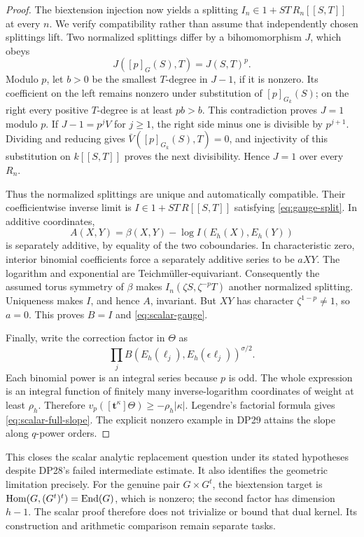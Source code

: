 \documentclass[11pt,a4paper]{article}
\theoremstyle{definition}\newtheorem{remark}[theorem]{Remark}
\begin{document}
\begin{proof}
The biextension injection now yields a splitting $I_n\in1+ST\,R_n[[S,T]]$ at every $n$. We verify compatibility rather than assume that independently chosen splittings lift. Two normalized splittings differ by a bihomomorphism $J$, which obeys
\[
 J([p]_G(S),T)=J(S,T)^p.
\]
Modulo $p$, let $b>0$ be the smallest $T$-degree in $J-1$, if it is nonzero. Its coefficient on the left remains nonzero under substitution of $[p]_{G_k}(S)$; on the right every positive $T$-degree is at least $pb>b$. This contradiction proves $J=1$ modulo $p$. If $J-1=p^jV$ for $j\ge1$, the right side minus one is divisible by $p^{j+1}$. Dividing and reducing gives $\bar V([p]_{G_k}(S),T)=0$, and injectivity of this substitution on $k[[S,T]]$ proves the next divisibility. Hence $J=1$ over every $R_n$.

Thus the normalized splittings are unique and automatically compatible. Their coefficientwise inverse limit is $I\in1+ST\,R[[S,T]]$ satisfying \eqref{eq:gauge-split}. In additive coordinates,
\[
 A(X,Y)=\beta(X,Y)-\log I(E_h(X),E_h(Y))
\]
is separately additive, by equality of the two coboundaries. In characteristic zero, interior binomial coefficients force a separately additive series to be $aXY$. The logarithm and exponential are Teichm\"uller-equivariant. Consequently the assumed torus symmetry of $\beta$ makes $I_n(\zeta S,\zeta^{-p}T)$ another normalized splitting. Uniqueness makes $I$, and hence $A$, invariant. But $XY$ has character $\zeta^{1-p}\ne1$, so $a=0$. This proves $B=I$ and \eqref{eq:scalar-gauge}.

Finally, write the correction factor in $\Theta$ as
\[
 \prod_j B(E_h(\ell_j),E_h(\epsilon\ell_j))^{\sigma/2}.
\]
Each binomial power is an integral series because $p$ is odd. The whole expression is an integral function of finitely many inverse-logarithm coordinates of weight at least $\rho_h$. Therefore $v_p([\mathbf t^\kappa]\Theta)\ge-\rho_h|\kappa|$. Legendre's factorial formula gives \eqref{eq:scalar-full-slope}. The explicit nonzero example in DP29 attains the slope along $q$-power orders.
\end{proof}

This closes the scalar analytic replacement question under its stated hypotheses despite DP28's failed intermediate estimate. It also identifies the geometric limitation precisely. For the genuine pair $G\times G^t$, the biextension target is $\operatorname{Hom}(G,(G^t)^t)=\operatorname{End}(G)$, which is nonzero; the second factor has dimension $h-1$. The scalar proof therefore does not trivialize or bound that dual kernel. Its construction and arithmetic comparison remain separate tasks.
\end{document}
